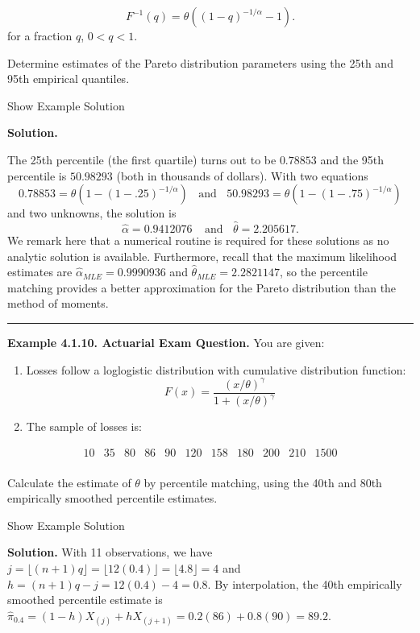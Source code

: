 \documentclass[]{book}
\providecommand{\tightlist}{%
  \setlength{\itemsep}{0pt}\setlength{\parskip}{0pt}}
\theoremstyle{definition}
\theoremstyle{definition}
\theoremstyle{definition}
\theoremstyle{remark}
\begin{document}
\[F^{-1}(q) = \theta \left( (1-q)^{-1/\alpha} -1 \right).\] for a
fraction \(q\), \(0<q<1\).

Determine estimates of the Pareto distribution parameters using the 25th
and 95th empirical quantiles.

Show Example Solution

\hypertarget{toggleExampleSelect.1.9}{}
\textbf{Solution.}

The 25th percentile (the first quartile) turns out to be \(0.78853\) and
the 95th percentile is \(50.98293\) (both in thousands of dollars). With
two equations
\[0.78853 = \theta \left( 1- (1-.25)^{-1/\alpha} \right) \ \ \ \ \text{and} \ \ \ \ 50.98293 = \theta \left( 1- (1-.75)^{-1/\alpha} \right)\]
and two unknowns, the solution is
\[\hat{\alpha} = 0.9412076 \ \ \ \ \ \text{and} \ \ \ \
\hat{\theta} = 2.205617 .\] We remark here that a numerical routine is
required for these solutions as no analytic solution is available.
Furthermore, recall that the maximum likelihood estimates are
\(\hat{\alpha}_{MLE} = 0.9990936\) and
\(\hat{\theta}_{MLE} = 2.2821147\), so the percentile matching provides
a better approximation for the Pareto distribution than the method of
moments.

\begin{center}\rule{0.5\linewidth}{\linethickness}\end{center}

\textbf{Example 4.1.10. Actuarial Exam Question.} You are given:

\begin{enumerate}
\def\labelenumi{(\roman{enumi})}
\tightlist
\item
  Losses follow a loglogistic distribution with cumulative distribution
  function:
  \[F(x) = \frac{\left(x/\theta\right)^{\gamma}}{1+\left(x/\theta\right)^{\gamma}}\]
\item
  The sample of losses is:
\end{enumerate}

\[
\begin{array}{ccccccccccc}
10 &35 &80 &86 &90 &120 &158 &180 &200 &210 &1500 \\
\end{array}
\]

Calculate the estimate of \(\theta\) by percentile matching, using the
40th and 80th empirically smoothed percentile estimates.

Show Example Solution

\hypertarget{toggleExampleSelect.1.10}{}
\textbf{Solution.} With 11 observations, we have
\(j=\lfloor(n+1)q\rfloor = \lfloor 12(0.4) \rfloor = \lfloor 4.8\rfloor=4\)
and \(h=(n+1)q-j = 12(0.4)-4=0.8\). By interpolation, the 40th
empirically smoothed percentile estimate is
\(\hat{\pi}_{0.4} = (1-h) X_{(j)} + h X_{(j+1)} = 0.2(86)+0.8(90)=89.2\).
\end{document}
